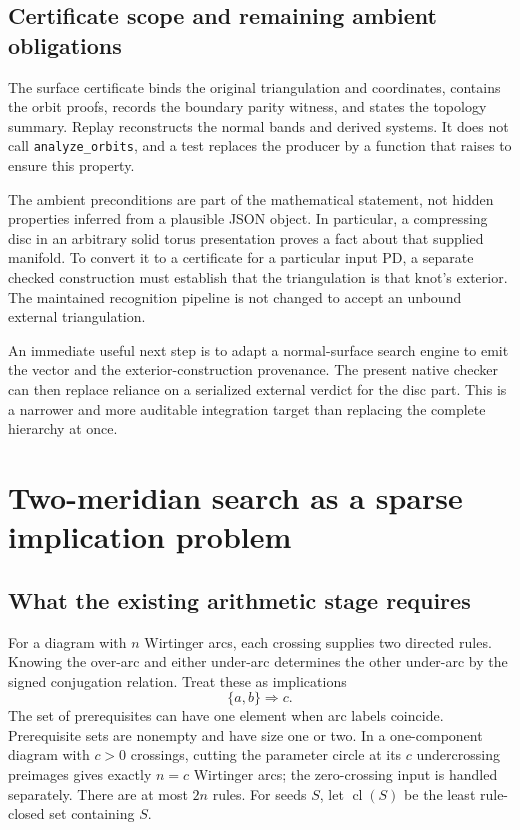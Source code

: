 \documentclass[11pt,a4paper]{article}
\theoremstyle{definition}\newtheorem{definition}[theorem]{Definition}
\theoremstyle{remark}\newtheorem{remark}[theorem]{Remark}
\newcommand{\cl}{\operatorname{cl}}
\newcommand{\code}[1]{\texttt{#1}}
\begin{document}
\subsection{Certificate scope and remaining ambient obligations}

The surface certificate binds the original triangulation and coordinates,
contains the orbit proofs, records the boundary parity witness, and states
the topology summary. Replay reconstructs the normal bands and derived
systems. It does not call \code{analyze\_orbits}, and a test replaces the
producer by a function that raises to ensure this property.

The ambient preconditions are part of the mathematical statement, not
hidden properties inferred from a plausible JSON object. In particular,
a compressing disc in an arbitrary solid torus presentation proves a
fact about that supplied manifold. To convert it to a certificate for a
particular input PD, a separate checked construction must establish that
the triangulation is that knot's exterior. The maintained recognition
pipeline is not changed to accept an unbound external triangulation.

An immediate useful next step is to adapt a normal-surface search engine
to emit the vector and the exterior-construction provenance. The present
native checker can then replace reliance on a serialized external verdict
for the disc part. This is a narrower and more auditable integration
target than replacing the complete hierarchy at once.

\section{Two-meridian search as a sparse implication problem}
\label{sec:seeds}

\subsection{What the existing arithmetic stage requires}

For a diagram with $n$ Wirtinger arcs, each crossing supplies two directed
rules. Knowing the over-arc and either under-arc determines the other
under-arc by the signed conjugation relation. Treat these as implications
\[
 \{a,b\}\Longrightarrow c.
\]
The set of prerequisites can have one element when arc labels coincide.
Prerequisite sets are nonempty and have size one or two. In a one-component
diagram with $c>0$ crossings, cutting the parameter circle at its $c$
undercrossing preimages gives exactly $n=c$ Wirtinger arcs; the zero-crossing
input is handled separately. There are at most $2n$ rules. For seeds $S$, let $\cl(S)$ be the least
rule-closed set containing $S$.
\end{document}
